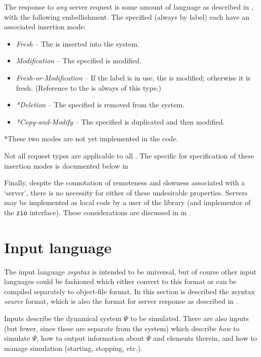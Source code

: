 The response to \emph{any} server request is some amount of  language as described in ,
with the following embellishment.
The  specified (always by label) each have an associated insertion mode:
\begin{itemize}
\item \emph{Fresh} -- The  is inserted into the system. 
\item \emph{Modification} -- The specified  is modified. 
\item \emph{Fresh-or-Modification} -- If the label is in use, the  is modified; otherwise it is fresh. (Reference to the  is always of this type.)
\item \emph{*Deletion} -- The specified  is removed from the system.
\item \emph{*Copy-and-Modify} -- The specified  is duplicated and then modified.
\end{itemize}
*These two modes are not yet implemented in the code.

Not all request types are applicable to all .
The specific  for specification of these insertion modes is documented below in 

Finally, despite the connotation of remoteness and slowness associated with a `server', there is no necessity for
either of these undesirable properties. Servers may be implemented as local code by a user of the library (and
implementor of the {\tt zio} interface). These considerations are discussed in  in .



\section{Input language}
\label{inplang}

The input language \emph{zsyntax} is intended to be universal, but of
course other input languages could be fashioned which either convert
to this format or can be compiled separately to object-file format.
In this section is described the zsyntax \emph{source}
format, which is also the format for server response as described in
.

Inputs describe the dynamical system $\Psi$ to be simulated. There are
also inputs (but fewer, since these are separate from the system)
which describe \emph{how} to simulate $\Psi$, how to output
information about $\Psi$ and elements therein, and how to manage
simulation (starting, stopping, etc.).

